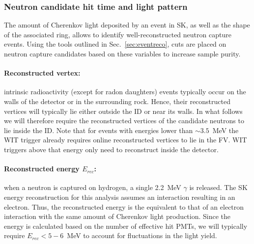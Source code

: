 \subsubsection{Neutron candidate hit time and light pattern}
The amount of Cherenkov light deposited by an event in SK, as well as the shape of the associated ring, allows to identify well-reconstructed neutron capture events. Using the tools outlined in Sec.~\ref{sec:eventreco}, cuts are placed on neutron capture candidates based on these variables to increase sample purity. 

\paragraph{Reconstructed vertex:} intrinsic radioactivity (except for radon daughters) events typically occur on the walls of the detector or in the surrounding rock. Hence, their reconstructed vertices will typically lie either outside the ID or near its walls. In what follows we will therefore require the reconstructed vertices of the candidate neutrons to lie inside the ID. Note that for events with energies lower than ${\sim}3.5$~MeV the WIT trigger already requires online reconstructed vertices to lie in the FV. WIT triggers above that energy only need to reconstruct inside the detector.

\paragraph{Reconstructed energy $E_{rec}$:} when a neutron is captured on hydrogen, a single 2.2~MeV $\gamma$ is released. The SK energy reconstruction for this analysis assumes an interaction resulting in an electron. Thus, the reconstructed energy is the equivalent to that of an electron interaction with the same amount of Cherenkov light production. Since the energy is calculated based on the number of effective hit PMTs, we will typically require $E_{rec} < 5-6$~MeV to account for fluctuations in the light yield. 

